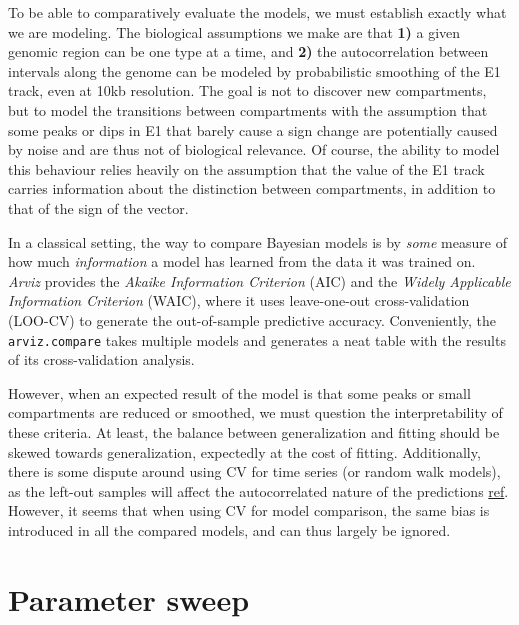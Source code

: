 \documentclass[
  10pt,
  a4paper,
  openany]{scrbook}
\begin{document}
To be able to comparatively evaluate the models, we must establish
exactly what we are modeling. The biological assumptions we make are
that \textbf{1)} a given genomic region can be one type at a time, and
\textbf{2)} the autocorrelation between intervals along the genome can
be modeled by probabilistic smoothing of the E1 track, even at 10kb
resolution. The goal is not to discover new compartments, but to model
the transitions between compartments with the assumption that some peaks
or dips in E1 that barely cause a sign change are potentially caused by
noise and are thus not of biological relevance. Of course, the ability
to model this behaviour relies heavily on the assumption that the value
of the E1 track carries information about the distinction between
compartments, in addition to that of the sign of the vector.

In a classical setting, the way to compare Bayesian models is by
\emph{some} measure of how much \emph{information} a model has learned
from the data it was trained on. \emph{Arviz} provides the \emph{Akaike
Information Criterion} (AIC) and the \emph{Widely Applicable Information
Criterion} (WAIC), where it uses leave-one-out cross-validation (LOO-CV)
to generate the out-of-sample predictive accuracy. Conveniently, the
\texttt{arviz.compare} takes multiple models and generates a neat table
with the results of its cross-validation analysis.

However, when an expected result of the model is that some peaks or
small compartments are reduced or smoothed, we must question the
interpretability of these criteria. At least, the balance between
generalization and fitting should be skewed towards generalization,
expectedly at the cost of fitting. Additionally, there is some dispute
around using CV for time series (or random walk models), as the left-out
samples will affect the autocorrelated nature of the predictions
\href{https://statmodeling.stat.columbia.edu/2015/01/16/loo-waic-time-series/}{ref}.
However, it seems that when using CV for model comparison, the same bias
is introduced in all the compared models, and can thus largely be
ignored.

\section{Parameter sweep}\label{parameter-sweep}
\end{document}

